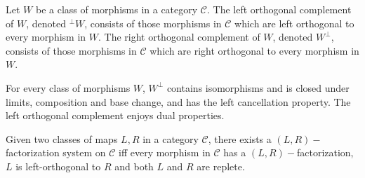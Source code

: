 \begin{definition}
  Let $W$ be a class of morphisms in a category $\mathcal{C}$. The left orthogonal complement of $W$, denoted ${}^{\bot}W$, consists of those morphisms in $\mathcal{C}$ which are left orthogonal to every morphism in $W$. The right orthogonal complement of $W$, denoted $W^\bot$, consists of those morphisms in $\mathcal{C}$ which are right orthogonal to every morphism in $W$.
\end{definition}

\begin{lemma}
  For every class of morphisms $W$, $W^\bot$ contains isomorphisms and is closed under limits, composition and base change, and has the left cancellation property. The left orthogonal complement enjoys dual properties.
\end{lemma}

\begin{theorem}
  Given two classes of maps $L,R$ in a category $\mathcal{C}$, there exists a $(L,R)-$factorization system on $\mathcal{C}$ iff every morphism in $\mathcal{C}$ has a $(L,R)-$factorization, $L$ is left-orthogonal to $R$ and both $L$ and $R$ are replete.
\end{theorem}